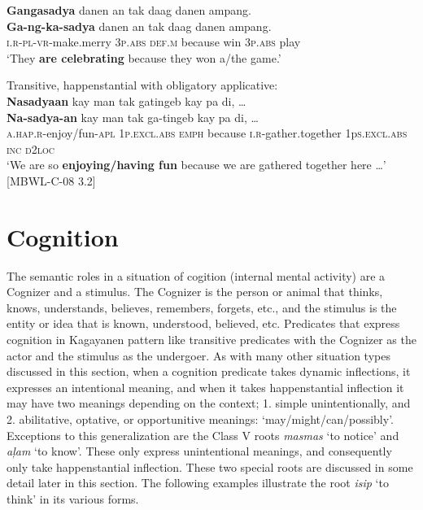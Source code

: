 \ea
\textbf{Gangasadya}  danen  an  tak  daag  danen  ampang. \\\smallskip
\gll \textbf{Ga-ng-ka-sadya}  danen  an  tak  daag  danen  ampang. \\
\textsc{i.r}-\textsc{pl}-\textsc{vr}-make.merry  3\textsc{p.abs}  \textsc{def.m}  because  win  3\textsc{p.abs}  play \\
‘They \textbf{are celebrating} because they won a/the game.’
\z

\largerpage
\ea
Transitive, happenstantial with obligatory applicative: \\
\textbf{Nasadyaan}  kay  man  tak  gatingeb kay  pa  di, … \\\smallskip
\gll \textbf{Na-sadya-an}  kay  man  tak  ga-tingeb kay  pa  di, … \\
\textsc{a.hap.r}-enjoy/fun-\textsc{apl}  1\textsc{p.excl.abs}  \textsc{emph}  because  \textsc{i.r}-gather.together
1p\textsc{s.excl.abs}  \textsc{inc}  \textsc{d2loc} \\
\glt `We are so \textbf{enjoying/having fun} because we are gathered together here …’ [MBWL-C-08 3.2]
\z

\section{Cognition}
\label{sec:cognition}

The semantic roles in a situation of cogition (internal mental activity) are a Cognizer and a stimulus. The Cognizer is the person or animal that thinks, knows, understands, believes, remembers, forgets, etc., and the stimulus is the entity or idea that is known, understood, believed, etc. Predicates that express cognition in Kagayanen pattern like transitive predicates with the Cognizer as the actor and the stimulus as the undergoer. As with many other situation types discussed in this section, when a cognition predicate takes dynamic inflections, it expresses an intentional meaning, and when it takes happenstantial inflection it may have two meanings depending on the context; 1. simple unintentionally, and 2. abilitative, optative, or opportunitive meanings: ‘may/might/can/possibly’. Exceptions to this generalization are the Class V roots \textit{masmas} ‘to notice’ and \textit{aļam} ‘to know’. These only express unintentional meanings, and consequently only take happenstantial inflection. These two special roots are discussed in some detail later in this section. The following examples illustrate the root \textit{isip} ‘to think’ in its various forms.

